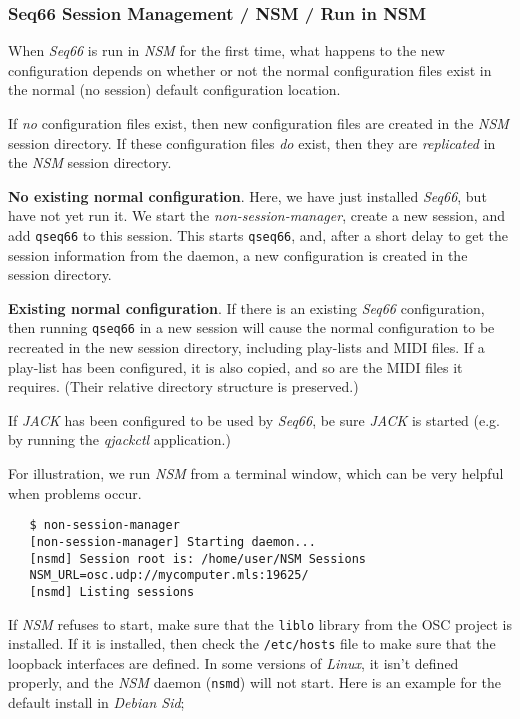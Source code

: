 \subsubsection{Seq66 Session Management / NSM / Run in NSM}
\label{subsec:sessions_nsm_first_run_in_nsm}

   When \textsl{Seq66} is run in \textsl{NSM} for the first time,
   what happens to the new configuration depends on whether or not 
   the normal configuration files exist in the normal (no session)
   default configuration location.

   If \textsl{no} configuration files exist,
   then new configuration files are created
   in the \textsl{NSM} session directory.
   If these configuration files \textsl{do} exist,
   then they are \textsl{replicated} in the \textsl{NSM} session directory.

   \textbf{No existing normal configuration}.
   Here, we have just installed \textsl{Seq66}, but have not
   yet run it.  We start the \textsl{non-session-manager}, create a new session,
   and add \texttt{qseq66} to this session.  This starts \texttt{qseq66}, and,
   after a short delay to get the session information from the daemon, a new
   configuration is created in the session directory.

   \textbf{Existing normal configuration}.
   If there is an existing \textsl{Seq66} configuration,
   then running \texttt{qseq66} in a new
   session will cause the normal configuration to be recreated in the new
   session directory, including play-lists and MIDI files.
   If a play-list has been configured, it is also
   copied, and so are the MIDI files it requires. (Their relative directory
   structure is preserved.)

   If \textsl{JACK} has been configured to be
   used by \textsl{Seq66}, be sure \textsl{JACK} is started (e.g. by running
   the \textsl{qjackctl} application.)

   For illustration, we run \textsl{NSM} from a terminal window, which can be
   very helpful when problems occur.

\begin{verbatim}
   $ non-session-manager
   [non-session-manager] Starting daemon...
   [nsmd] Session root is: /home/user/NSM Sessions
   NSM_URL=osc.udp://mycomputer.mls:19625/
   [nsmd] Listing sessions
\end{verbatim}

   If \textsl{NSM} refuses to start, make sure that the \texttt{liblo} library
   from the OSC project is installed.  If it is installed, then check the
   \texttt{/etc/hosts} file to make sure that the loopback interfaces are
   defined. In some versions of \textsl{Linux}, it isn't defined properly,
   and the \textsl{NSM} daemon (\texttt{nsmd}) will not start.
   Here is an example for the default install in \textsl{Debian Sid};


